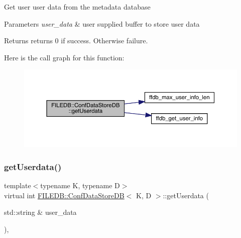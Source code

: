 Get user user data from the metadata database


\begin{DoxyParams}{Parameters}
{\em user\+\_\+data} & user supplied buffer to store user data \\
\hline
\end{DoxyParams}
\begin{DoxyReturn}{Returns}
returns 0 if success. Otherwise failure. 
\end{DoxyReturn}
Here is the call graph for this function\+:
\nopagebreak
\begin{figure}[H]
\begin{center}
\leavevmode
\includegraphics[width=350pt]{d8/d19/classFILEDB_1_1ConfDataStoreDB_abf7ce0847e1d68f960836826d68c0079_cgraph}
\end{center}
\end{figure}
\mbox{\label{classFILEDB_1_1ConfDataStoreDB_abf7ce0847e1d68f960836826d68c0079}} 
\subsubsection{\texorpdfstring{getUserdata()}{getUserdata()}\hspace{0.1cm}{\footnotesize\ttfamily [2/3]}}
{\footnotesize\ttfamily template$<$typename K, typename D$>$ \\
virtual int \mbox{\hyperlink{classFILEDB_1_1ConfDataStoreDB}{F\+I\+L\+E\+D\+B\+::\+Conf\+Data\+Store\+DB}}$<$ K, D $>$\+::get\+Userdata (\begin{DoxyParamCaption}\item[{std\+::string \&}]{user\+\_\+data }\end{DoxyParamCaption})\hspace{0.3cm}{\ttfamily [inline]}, {\ttfamily [virtual]}}

